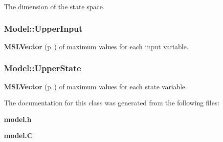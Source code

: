 The dimension of the state space.

\subsubsection{ Model::Upper\-Input}\label{classModel_m4}


{\bf MSLVector} {\rm (p.\,\pageref{classMSLVector})} of maximum values for each input variable.

\subsubsection{ Model::Upper\-State}\label{classModel_m2}


{\bf MSLVector} {\rm (p.\,\pageref{classMSLVector})} of maximum values for each state variable.



The documentation for this class was generated from the following files:\begin{CompactItemize}
\item 
{\bf model.h}\item 
{\bf model.C}\end{CompactItemize}
